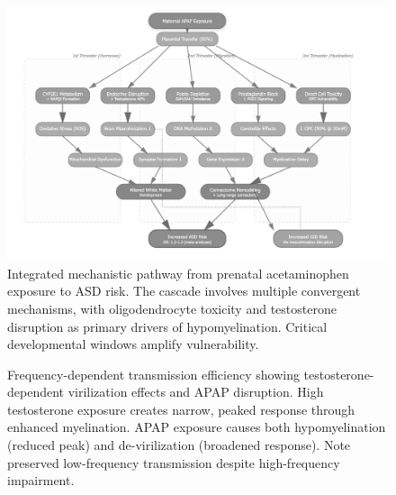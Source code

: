\documentclass[11pt]{article}
\begin{document}
\begin{figure}[h]
\centering
\includegraphics[width=\textwidth]{../assets/MechanisticPathways.jpg}
\caption{Integrated mechanistic pathway from prenatal acetaminophen exposure to ASD risk. The cascade involves multiple convergent mechanisms, with oligodendrocyte toxicity and testosterone disruption as primary drivers of hypomyelination. Critical developmental windows amplify vulnerability.}
\label{fig:pathway}
\end{figure}

\begin{figure}[h]
\centering
{}
\caption{Frequency-dependent transmission efficiency showing testosterone-dependent virilization effects and APAP disruption. High testosterone exposure creates narrow, peaked response through enhanced myelination. APAP exposure causes both hypomyelination (reduced peak) and de-virilization (broadened response). Note preserved low-frequency transmission despite high-frequency impairment.}
\label{fig:frequency}
\end{figure}
\end{document}
